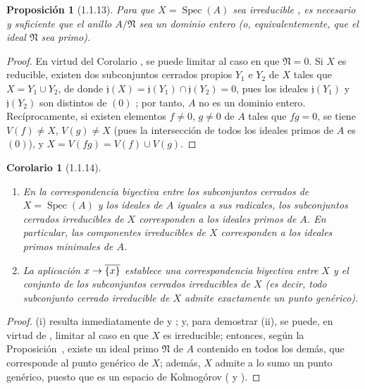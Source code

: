 \documentclass[oneside]{amsart}
\theoremstyle{ega-env-style}
\theoremstyle{ega-thm-env-style}
\newtheorem*{proposition}{Proposición}
\newtheorem*{corollary}{Corolario}
\theoremstyle{ega-defn-env-style}
\renewcommand{\to}{\mathchoice{\longrightarrow}{\rightarrow}{\rightarrow}{\rightarrow}}
\newcommand{\oldpage}[2][]{{\marginnote{\normalfont{\textbf{#1}~|~#2}}}\ignorespaces}
\let\EGAOriginalLabel\label
\renewcommand{\label}[1]{\phantomsection\EGAOriginalLabel{#1}}
\begin{document}
\begin{proposition}[1.1.13]
\label{I.1.1.13}
Para que $X=\operatorname{Spec}(A)$ sea irreducible , es necesario y suficiente que el anillo $A/\mathfrak{N}$ sea un dominio entero \textup{(o, equivalentemente, que el ideal $\mathfrak{N}$ sea \emph{primo})}.
\end{proposition}

\begin{proof}
En virtud del Corolario , se puede limitar al caso en que $\mathfrak{N}=0$.
Si $X$ es reducible, existen dos subconjuntos cerrados propios $Y_1$ e $Y_2$ de $X$ tales que $X=Y_1\cup Y_2$, de donde $\mathfrak{j}(X)=\mathfrak{j}(Y_1)\cap\mathfrak{j}(Y_2)=0$, pues los ideales $\mathfrak{j}(Y_1)$ y $\mathfrak{j}(Y_2)$ son distintos de $(0)$ ;
por tanto, $A$ no es un dominio entero.
Recíprocamente, si existen elementos $f\neq0$, $g\neq0$ de $A$ tales que $fg=0$, se tiene $V(f)\neq X$, $V(g)\neq X$ (pues la intersección de todos los ideales primos de $A$ es $(0)$), y $X=V(fg)=V(f)\cup V(g)$.
\end{proof}

\begin{corollary}[1.1.14]
\label{I.1.1.14}
\medskip\noindent
\begin{enumerate}
  \item[{\rm(i)}] En la correspondencia biyectiva entre los subconjuntos cerrados de $X=\operatorname{Spec}(A)$ y los ideales de $A$ iguales a sus radicales, los subconjuntos cerrados irreducibles de $X$ corresponden a los ideales primos de $A$.
    En particular, las componentes irreducibles de $X$ corresponden a los ideales primos minimales de $A$.
  \item[{\rm(ii)}] La aplicación $x\to\overline{\{x\}}$ establece una correspondencia biyectiva entre $X$ y el conjunto de los subconjuntos cerrados irreducibles de $X$ \textup{(es decir, \emph{todo subconjunto cerrado irreducible de $X$ admite exactamente un punto genérico})}.
\end{enumerate}
\end{corollary}

\begin{proof}
(i) resulta inmediatamente de  y ;
y, para demostrar (ii), se puede, en virtud de , limitar al caso en que $X$ es irreducible;
entonces, según la Proposición~, existe un ideal primo $\mathfrak{N}$ de $A$ contenido en todos los demás, que corresponde al punto genérico
\oldpage[I]{83}
de $X$;
además, $X$ admite a lo sumo un punto genérico, puesto que es un espacio de Kolmogórov ( y ).
\end{proof}
\end{document}
